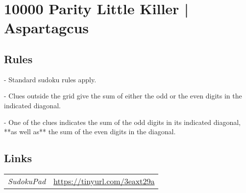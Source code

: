 \section[10000 Parity Little Killer | Aspartagcus {[\emph{Parity Little Killer Sudoku}]}]{10000 Parity Little Killer | {\normalfont Aspartagcus}}
\label{sec:47-10000-parity-little-killer-aspartagcus}

\subsection*{Rules}
\begin{markdown}
- Standard sudoku rules apply.

- Clues outside the grid give the sum of either the odd or the even digits in the indicated diagonal.

- One of the clues indicates the sum of the odd digits in its indicated diagonal, **as well as** the sum of the even digits in the diagonal.
\end{markdown}
\subsection*{Links}
\begin{tabularx}{\textwidth}{l X}
\emph{SudokuPad} & \url{https://tinyurl.com/3eaxt29a} \\
\end{tabularx}
\pagebreak
